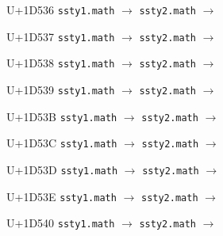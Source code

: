 \documentclass{article}
\begin{document}
\begin{substitutions}
\goodbreak

U+1D536  \linebreak
    \texttt{ssty1.math} $\to$  \linebreak
    \texttt{ssty2.math} $\to$  

\goodbreak

U+1D537  \linebreak
    \texttt{ssty1.math} $\to$  \linebreak
    \texttt{ssty2.math} $\to$  

\goodbreak

U+1D538  \linebreak
    \texttt{ssty1.math} $\to$  \linebreak
    \texttt{ssty2.math} $\to$  

\goodbreak

U+1D539  \linebreak
    \texttt{ssty1.math} $\to$  \linebreak
    \texttt{ssty2.math} $\to$  

\goodbreak

U+1D53B  \linebreak
    \texttt{ssty1.math} $\to$  \linebreak
    \texttt{ssty2.math} $\to$  

\goodbreak

U+1D53C  \linebreak
    \texttt{ssty1.math} $\to$  \linebreak
    \texttt{ssty2.math} $\to$  

\goodbreak

U+1D53D  \linebreak
    \texttt{ssty1.math} $\to$  \linebreak
    \texttt{ssty2.math} $\to$  

\goodbreak

U+1D53E  \linebreak
    \texttt{ssty1.math} $\to$  \linebreak
    \texttt{ssty2.math} $\to$  

\goodbreak

U+1D540  \linebreak
    \texttt{ssty1.math} $\to$  \linebreak
    \texttt{ssty2.math} $\to$  


\end{substitutions}
\end{document}

